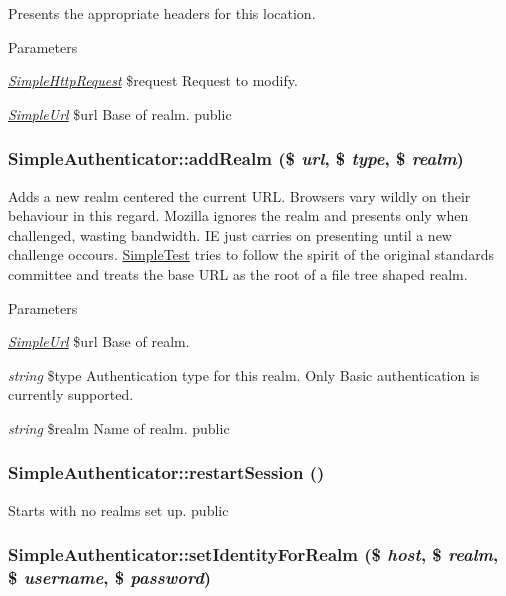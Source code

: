 \label{class_simple_authenticator_a452ef4613fe6b053cf086d4e31dfefb0}
Presents the appropriate headers for this location. 
\begin{DoxyParams}{Parameters}
\item[{\em \hyperlink{class_simple_http_request}{SimpleHttpRequest}}]\$request Request to modify. \item[{\em \hyperlink{class_simple_url}{SimpleUrl}}]\$url Base of realm.  public \end{DoxyParams}
\hypertarget{class_simple_authenticator_aff0493eebbba01ffac2f25e5a986fa9d}{
\subsubsection[{addRealm}]{\setlength{\rightskip}{0pt plus 5cm}SimpleAuthenticator::addRealm (\$ {\em url}, \/  \$ {\em type}, \/  \$ {\em realm})}}
\label{class_simple_authenticator_aff0493eebbba01ffac2f25e5a986fa9d}
Adds a new realm centered the current URL. Browsers vary wildly on their behaviour in this regard. Mozilla ignores the realm and presents only when challenged, wasting bandwidth. IE just carries on presenting until a new challenge occours. \hyperlink{class_simple_test}{SimpleTest} tries to follow the spirit of the original standards committee and treats the base URL as the root of a file tree shaped realm. 
\begin{DoxyParams}{Parameters}
\item[{\em \hyperlink{class_simple_url}{SimpleUrl}}]\$url Base of realm. \item[{\em string}]\$type Authentication type for this realm. Only Basic authentication is currently supported. \item[{\em string}]\$realm Name of realm.  public \end{DoxyParams}
\hypertarget{class_simple_authenticator_a3607a43a51682171774b003bd9cad14e}{
\subsubsection[{restartSession}]{\setlength{\rightskip}{0pt plus 5cm}SimpleAuthenticator::restartSession ()}}
\label{class_simple_authenticator_a3607a43a51682171774b003bd9cad14e}
Starts with no realms set up.  public \hypertarget{class_simple_authenticator_a557e4ed50c3623b0fc777dbf6723d5d3}{
\subsubsection[{setIdentityForRealm}]{\setlength{\rightskip}{0pt plus 5cm}SimpleAuthenticator::setIdentityForRealm (\$ {\em host}, \/  \$ {\em realm}, \/  \$ {\em username}, \/  \$ {\em password})}}
